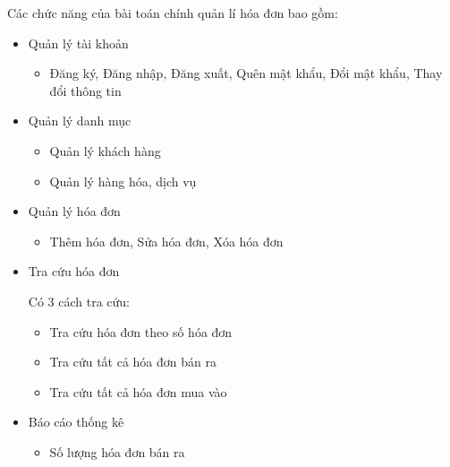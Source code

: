 Các chức năng của bài toán chính quản lí hóa đơn bao gồm:
\begin{itemize}



\item Quản lý tài khoản
\begin{itemize}
    \item Đăng ký, Đăng nhập, Đăng xuất, Quên mật khẩu, Đổi mật khẩu, Thay đổi thông tin
\end{itemize}


\item Quản lý danh mục

\begin{itemize}

\item Quản lý khách hàng

\item Quản lý hàng hóa, dịch vụ

\end{itemize}




\item Quản lý hóa đơn

\begin{itemize}

\item Thêm hóa đơn, Sửa hóa đơn, Xóa hóa đơn

\end{itemize}



\item Tra cứu hóa đơn

Có 3 cách tra cứu:

\begin{itemize}

\item Tra cứu hóa đơn theo số hóa đơn

\item Tra cứu tất cả hóa đơn bán ra

\item Tra cứu tất cả hóa đơn mua vào

\end{itemize}



\item Báo cáo thống kê

\begin{itemize}

\item Số lượng hóa đơn bán ra


\end{itemize}
\end{itemize}
